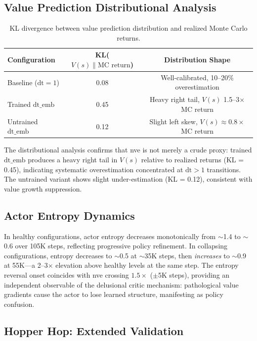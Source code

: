 \documentclass[10pt,letterpaper]{article}
\newcommand{\dt}{\mathrm{dt}}
\begin{document}
\subsection{Value Prediction Distributional Analysis}
\label{sec:distributional}

\begin{table}[h]
\centering
\caption{KL divergence between value prediction distribution and realized Monte Carlo returns.}
\label{tab:distributional}
\begin{tabular}{lcc}
\toprule
Configuration & KL($V(s) \| \text{MC return}$) & Distribution Shape \\
\midrule
Baseline ($\dt=1$) & 0.08 & Well-calibrated, 10--20\% overestimation \\
Trained $\dt\_\text{emb}$ & 0.45 & Heavy right tail, $V(s)$ 1.5--3$\times$ MC return \\
Untrained $\dt\_\text{emb}$ & 0.12 & Slight left skew, $V(s) \approx 0.8\times$ MC return \\
\bottomrule
\end{tabular}
\end{table}

The distributional analysis confirms that nve is not merely a crude proxy: trained $\dt\_\text{emb}$ produces a heavy right tail in $V(s)$ relative to realized returns (KL = 0.45), indicating systematic overestimation concentrated at $\dt > 1$ transitions.
The untrained variant shows slight under-estimation (KL = 0.12), consistent with value growth suppression.

\subsection{Actor Entropy Dynamics}
\label{sec:entropy}

In healthy configurations, actor entropy decreases monotonically from $\sim$1.4 to $\sim$0.6 over 105K steps, reflecting progressive policy refinement.
In collapsing configurations, entropy decreases to $\sim$0.5 at $\sim$35K steps, then \emph{increases} to $\sim$0.9 at 55K---a 2--3$\times$ elevation above healthy levels at the same step.
The entropy reversal onset coincides with nve crossing $1.5\times$ ($\pm$5K steps), providing an independent observable of the delusional critic mechanism: pathological value gradients cause the actor to lose learned structure, manifesting as policy confusion.

\subsection{Hopper Hop: Extended Validation}
\label{sec:hopper}
\end{document}
